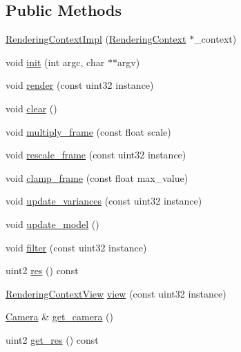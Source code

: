 \subsection*{Public Methods}
\begin{DoxyCompactItemize}
\item 
\hyperlink{struct_rendering_context_impl_a03c8ddb57af7c91c41637c7fd0467b3b}{Rendering\+Context\+Impl} (\hyperlink{struct_rendering_context}{Rendering\+Context} $\ast$\+\_\+context)
\item 
void \hyperlink{struct_rendering_context_impl_a6ed8abe2a35f936c642254279c635a45}{init} (int argc, char $\ast$$\ast$argv)
\item 
void \hyperlink{struct_rendering_context_impl_aaf8b4f561e0beee260fbccddece3d96d}{render} (const uint32 instance)
\item 
void \hyperlink{struct_rendering_context_impl_af2a6da1af1cbc483eeeb47ac63bcb30c}{clear} ()
\item 
void \hyperlink{struct_rendering_context_impl_af5083af72cc3e226381c4b2a5562375a}{multiply\+\_\+frame} (const float scale)
\item 
void \hyperlink{struct_rendering_context_impl_a12645d5a60a56769cd816a3e4733687b}{rescale\+\_\+frame} (const uint32 instance)
\item 
void \hyperlink{struct_rendering_context_impl_af0fb958dc3632540d622ad580487ef1f}{clamp\+\_\+frame} (const float max\+\_\+value)
\item 
void \hyperlink{struct_rendering_context_impl_aa6239f554359fcd6fb8c52343ef6e8ab}{update\+\_\+variances} (const uint32 instance)
\item 
void \hyperlink{struct_rendering_context_impl_a56fb48c6ec74446e25a8c3cc95a291c7}{update\+\_\+model} ()
\item 
void \hyperlink{struct_rendering_context_impl_a8c5fa978dc9a84c80828b493f17853bf}{filter} (const uint32 instance)
\item 
uint2 \hyperlink{struct_rendering_context_impl_a6481f4a2884fda739feecf503a7b9266}{res} () const
\item 
\hyperlink{struct_rendering_context_view}{Rendering\+Context\+View} \hyperlink{struct_rendering_context_impl_a0c673e0e6bc116a9c035b4ae90973036}{view} (const uint32 instance)
\item 
\hyperlink{struct_camera}{Camera} \& \hyperlink{struct_rendering_context_impl_ac5cd84771571ce603c28a6a725b2e6e5}{get\+\_\+camera} ()
\item 
uint2 \hyperlink{struct_rendering_context_impl_a691288ce177e1411abfcc6589d47e788}{get\+\_\+res} () const
$$
\end{DoxyCompactItemize}
